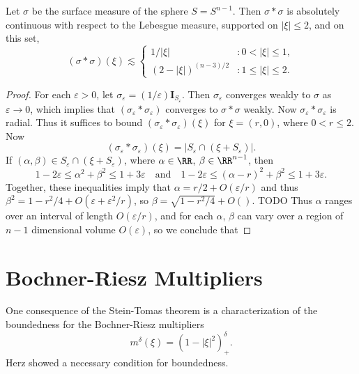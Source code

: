 \begin{lemma}
  Let $\sigma$ be the surface measure of the sphere $S = S^{n-1}$. Then $\sigma * \sigma$ is absolutely continuous with respect to the Lebesgue measure, supported on $|\xi| \leq 2$, and on this set,
  \[ (\sigma * \sigma)(\xi) \lesssim \begin{cases} 1/|\xi| &: 0 < |\xi| \leq 1, \\ (2 - |\xi|)^{(n-3)/2} &: 1 \leq |\xi| \leq 2. \end{cases} \]
\end{lemma}
\begin{proof}
  For each $\varepsilon > 0$, let $\sigma_\varepsilon = (1/\varepsilon) \mathbf{I}_{S_\varepsilon}$. Then $\sigma_\varepsilon$ converges weakly to $\sigma$ as $\varepsilon \to 0$, which implies that $(\sigma_\varepsilon * \sigma_\varepsilon)$ converges to $\sigma * \sigma$ weakly. Now $\sigma_\varepsilon * \sigma_\varepsilon$ is radial. Thus it suffices to bound $(\sigma_\varepsilon * \sigma_\varepsilon)(\xi)$ for $\xi = (r,0)$, where $0 < r \leq 2$. Now
  \[ (\sigma_\varepsilon * \sigma_\varepsilon)(\xi) = |S_\varepsilon \cap (\xi + S_\varepsilon)|. \]
  If $(\alpha,\beta) \in S_\varepsilon \cap (\xi + S_\varepsilon)$, where $\alpha \in \RR$, $\beta \in \RR^{n-1}$, then
  \[ 1 - 2\varepsilon \leq \alpha^2 + \beta^2 \leq 1 + 3\varepsilon\quad\text{and}\quad 1 - 2\varepsilon \leq (\alpha - r)^2 + \beta^2 \leq 1 + 3\varepsilon. \]
  Together, these inequalities imply that $\alpha = r/2 + O(\varepsilon/r)$ and thus $\beta^2 = 1 - r^2/4 + O(\varepsilon + \varepsilon^2/r)$, so $\beta = \sqrt{1 - r^2/4} + O()$. TODO Thus $\alpha$ ranges over an interval of length $O(\varepsilon/r)$, and for each $\alpha$, $\beta$ can vary over a region of $n-1$ dimensional volume $O(\varepsilon)$, so we conclude that
\end{proof}

\section{Bochner-Riesz Multipliers}

One consequence of the Stein-Tomas theorem is a characterization of the boundedness for the Bochner-Riesz multipliers
%
\[ m^\delta(\xi) = (1 - |\xi|^2)_+^\delta. \]
%
Herz showed a necessary condition for boundedness.

